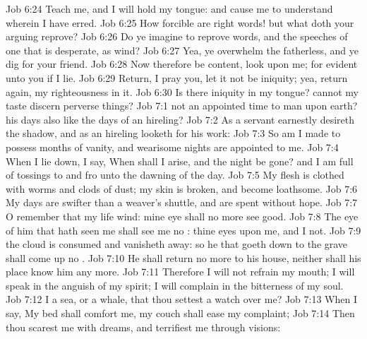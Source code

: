 \vs Job 6:24 Teach me, and I will hold my tongue: and cause me to understand wherein I have erred.
\vs Job 6:25 How forcible are right words! but what doth your arguing reprove?
\vs Job 6:26 Do ye imagine to reprove words, and the speeches of one that is desperate,  as wind?
\vs Job 6:27 Yea, ye overwhelm the fatherless, and ye dig  for your friend.
\vs Job 6:28 Now therefore be content, look upon me; for  evident unto you if I lie.
\vs Job 6:29 Return, I pray you, let it not be iniquity; yea, return again, my righteousness  in it.
\vs Job 6:30 Is there iniquity in my tongue? cannot my taste discern perverse things?
\vs Job 7:1  not an appointed time to man upon earth?  his days also like the days of an hireling?
\vs Job 7:2 As a servant earnestly desireth the shadow, and as an hireling looketh for  his work:
\vs Job 7:3 So am I made to possess months of vanity, and wearisome nights are appointed to me.
\vs Job 7:4 When I lie down, I say, When shall I arise, and the night be gone? and I am full of tossings to and fro unto the dawning of the day.
\vs Job 7:5 My flesh is clothed with worms and clods of dust; my skin is broken, and become loathsome.
\vs Job 7:6 My days are swifter than a weaver's shuttle, and are spent without hope.
\vs Job 7:7 O remember that my life  wind: mine eye shall no more see good.
\vs Job 7:8 The eye of him that hath seen me shall see me no : thine eyes  upon me, and I  not.
\vs Job 7:9  the cloud is consumed and vanisheth away: so he that goeth down to the grave shall come up no .
\vs Job 7:10 He shall return no more to his house, neither shall his place know him any more.
\vs Job 7:11 Therefore I will not refrain my mouth; I will speak in the anguish of my spirit; I will complain in the bitterness of my soul.
\vs Job 7:12  I a sea, or a whale, that thou settest a watch over me?
\vs Job 7:13 When I say, My bed shall comfort me, my couch shall ease my complaint;
\vs Job 7:14 Then thou scarest me with dreams, and terrifiest me through visions:
